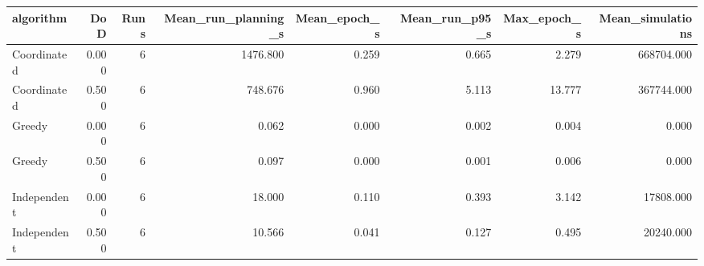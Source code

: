 \begin{tabular}{lrrrrrrr}
\toprule
algorithm & DoD & Runs & Mean\_run\_planning\_s & Mean\_epoch\_s & Mean\_run\_p95\_s & Max\_epoch\_s & Mean\_simulations \\
\midrule
Coordinated & 0.000 & 6 & 1476.800 & 0.259 & 0.665 & 2.279 & 668704.000 \\
Coordinated & 0.500 & 6 & 748.676 & 0.960 & 5.113 & 13.777 & 367744.000 \\
Greedy & 0.000 & 6 & 0.062 & 0.000 & 0.002 & 0.004 & 0.000 \\
Greedy & 0.500 & 6 & 0.097 & 0.000 & 0.001 & 0.006 & 0.000 \\
Independent & 0.000 & 6 & 18.000 & 0.110 & 0.393 & 3.142 & 17808.000 \\
Independent & 0.500 & 6 & 10.566 & 0.041 & 0.127 & 0.495 & 20240.000 \\
\bottomrule
\end{tabular}
